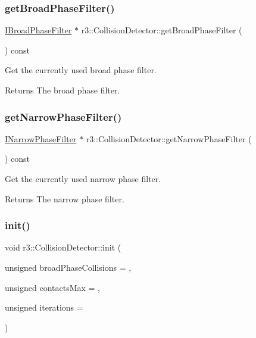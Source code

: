\subsubsection{\texorpdfstring{get\+Broad\+Phase\+Filter()}{getBroadPhaseFilter()}}
{\footnotesize\ttfamily \mbox{\hyperlink{classr3_1_1_i_broad_phase_filter}{I\+Broad\+Phase\+Filter}} $\ast$ r3\+::\+Collision\+Detector\+::get\+Broad\+Phase\+Filter (\begin{DoxyParamCaption}{ }\end{DoxyParamCaption}) const}



Get the currently used broad phase filter. 

\begin{DoxyReturn}{Returns}
The broad phase filter. 
\end{DoxyReturn}
\mbox{\label{classr3_1_1_collision_detector_aa43b5d1332028d15a3c9af1ec4cd4312}} 
\subsubsection{\texorpdfstring{get\+Narrow\+Phase\+Filter()}{getNarrowPhaseFilter()}}
{\footnotesize\ttfamily \mbox{\hyperlink{classr3_1_1_i_narrow_phase_filter}{I\+Narrow\+Phase\+Filter}} $\ast$ r3\+::\+Collision\+Detector\+::get\+Narrow\+Phase\+Filter (\begin{DoxyParamCaption}{ }\end{DoxyParamCaption}) const}



Get the currently used narrow phase filter. 

\begin{DoxyReturn}{Returns}
The narrow phase filter. 
\end{DoxyReturn}
\mbox{\label{classr3_1_1_collision_detector_a252e876b389dae66368afa210b93f31e}} 
\subsubsection{\texorpdfstring{init()}{init()}}
{\footnotesize\ttfamily void r3\+::\+Collision\+Detector\+::init (\begin{DoxyParamCaption}\item[{unsigned}]{broad\+Phase\+Collisions = {},  }\item[{unsigned}]{contacts\+Max = {},  }\item[{unsigned}]{iterations = {} }\end{DoxyParamCaption})}



